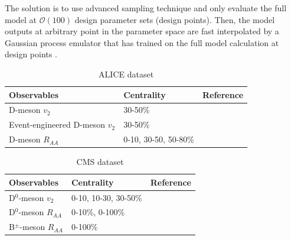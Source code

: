 \documentclass[aps, prc, reprint, amsmath, groupedaddress, nofootinbib]{revtex4-1}
\begin{document}
The solution is to use advanced sampling technique and only evaluate the full model at $\mathcal{O}(100)$ design parameter sets (design points).
Then, the model outputs at arbitrary point in the parameter space are fast interpolated by a Gaussian process emulator that has trained on the full model calculation at design points \cite{Rasmussen:2006gp}.
\begin{center}
\begin{table}[h]
\caption{ALICE dataset}\label{table:ALICE-obs} 
\begin{tabularx}{\columnwidth}{XXX}
\hline 
 Observables & Centrality & Reference\\ 
\hline 
D-meson $v_2$ & 30-50\% & \cite{Acharya:2017qps}\\ 
\hline 
Event-engineered D-meson $v_2$ & 30-50\% & \cite{Grosa:2017zcz}\\ 
\hline 
D-meson $R_{AA}$ & 0-10, 30-50, 50-80\% & \cite{Acharya:2018hre}\\
\hline 
\end{tabularx}
\end{table}
\begin{table}[h]
\caption{CMS dataset}\label{table:CMS-obs} 
\begin{tabularx}{\columnwidth}{XXX}
\hline 
Observables & Centrality & Reference\\ 
\hline 
D${}^0$-meson $v_2$ & 0-10, 10-30, 30-50\% & \cite{Sirunyan:2017plt}\\ 
\hline 
D${}^0$-meson $R_{AA}$ & 0-10\%, 0-100\% & \cite{Sirunyan:2017xss}\\ 
\hline 
B${}^{\pm}$-meson $R_{AA}$ & 0-100\% & \cite{Sirunyan:2017oug}\\ 
\hline 
\end{tabularx}
\end{table}
\end{center}
\end{document}
